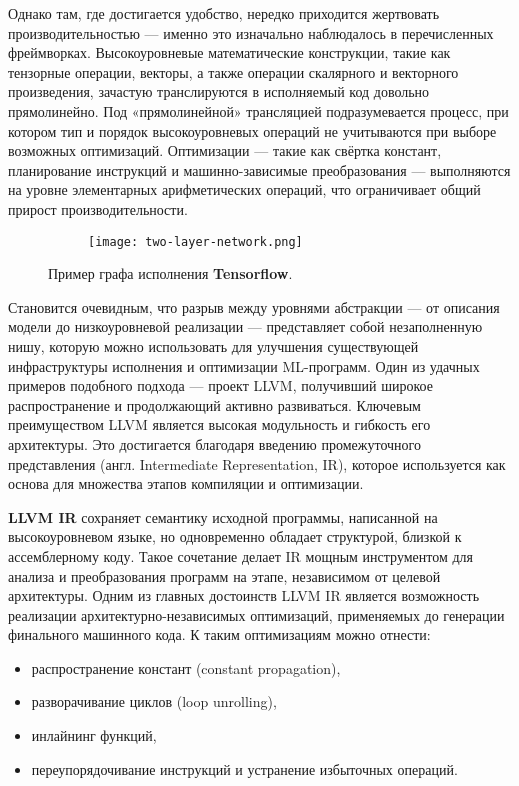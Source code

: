 Однако там, где достигается удобство, нередко приходится жертвовать производительностью — именно это изначально наблюдалось в перечисленных фреймворках.
Высокоуровневые математические конструкции, такие как тензорные операции, векторы, а также операции скалярного и векторного произведения, зачастую транслируются в исполняемый код довольно прямолинейно.
Под «прямолинейной» трансляцией подразумевается процесс, при котором тип и порядок высокоуровневых операций не учитываются при выборе возможных оптимизаций.
Оптимизации — такие как свёртка констант, планирование инструкций и машинно-зависимые преобразования — выполняются на уровне элементарных арифметических операций, что ограничивает общий прирост производительности.

\begin{figure}[h]
    \centering
    \begin{subfigure}{0.45\textwidth}
        \centering
        \texttt{[image: two-layer-network.png]}
        \label{fig:sub2}
    \end{subfigure}
    \caption{Пример графа исполнения \textbf{Tensorflow}.}
    \label{fig:main}
\end{figure}

Становится очевидным, что разрыв между уровнями абстракции — от описания модели до низкоуровневой реализации — представляет собой незаполненную нишу, которую можно использовать для улучшения существующей инфраструктуры исполнения и оптимизации ML-программ.
Один из удачных примеров подобного подхода — проект LLVM, получивший широкое распространение и продолжающий активно развиваться.
Ключевым преимуществом LLVM является высокая модульность и гибкость его архитектуры.
Это достигается благодаря введению промежуточного представления (англ. Intermediate Representation, IR), которое используется как основа для множества этапов компиляции и оптимизации.

\textbf{LLVM IR} сохраняет семантику исходной программы, написанной на высокоуровневом языке, но одновременно обладает структурой, близкой к ассемблерному коду.
Такое сочетание делает IR мощным инструментом для анализа и преобразования программ на этапе, независимом от целевой архитектуры.
Одним из главных достоинств LLVM IR является возможность реализации архитектурно-независимых оптимизаций, применяемых до генерации финального машинного кода. К таким оптимизациям можно отнести:

\begin{itemize}
    \item распространение констант (constant propagation),
    \item разворачивание циклов (loop unrolling),
    \item  инлайнинг функций,
    \item переупорядочивание инструкций и устранение избыточных операций.
\end{itemize}

